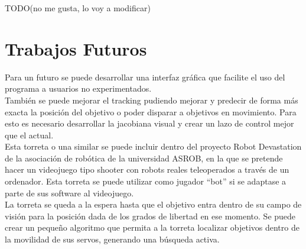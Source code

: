 TODO(no me gusta, lo voy a modificar)\\

\newpage


\section{Trabajos Futuros}
Para un futuro se puede desarrollar una interfaz gráfica que facilite el uso del programa a usuarios no experimentados.\\

También se puede mejorar el tracking pudiendo mejorar y predecir de forma más exacta la posición del objetivo o poder disparar a objetivos en movimiento. Para esto es necesario desarrollar la jacobiana visual y crear un lazo de control mejor que el actual.\\

Esta torreta o una similar se puede incluir dentro del proyecto Robot Devastation de la asociación de robótica de la universidad ASROB, en la que se pretende hacer un videojuego tipo shooter con robots reales teleoperados a través de un ordenador. Esta torreta se puede utilizar como jugador “bot” si se adaptase a parte de sus software al videojuego.\\

La torreta se queda a la espera hasta que el objetivo entra dentro de su campo de visión para la posición dada de los grados de libertad en ese momento. Se puede crear un pequeño algoritmo que permita a la torreta localizar objetivos dentro de la movilidad de sus servos, generando una búsqueda activa.\\